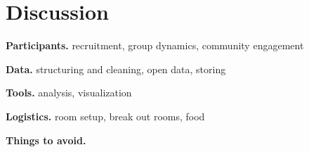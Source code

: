 \section{Discussion}

\textbf{Participants.} recruitment, group dynamics, community engagement

\textbf{Data.} structuring and cleaning, open data, storing

\textbf{Tools.} analysis, visualization

\textbf{Logistics.} room setup, break out rooms, food

\textbf{Things to avoid.}